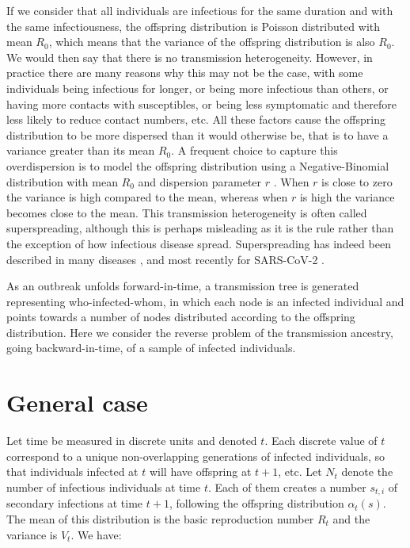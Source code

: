 \documentclass{article}
\begin{document}
If we consider that all
individuals are infectious for the same duration and with the same infectiousness,
the offspring distribution is Poisson distributed with mean $R_0$, which means that the variance
of the offspring distribution is also $R_0$. We would then say that there is no transmission
heterogeneity. However, in practice there are many reasons why this may not be the case,
with some individuals being infectious for longer, or being more infectious than others, or 
having more contacts with susceptibles, or being less symptomatic and therefore less likely
to reduce contact numbers, etc. All these factors cause the offspring distribution to be more 
dispersed than it would otherwise be, that is to have a variance greater than its mean $R_0$. 
A frequent choice to capture this overdispersion is to model the offspring distribution
using a Negative-Binomial distribution with mean $R_0$ and dispersion parameter $r$
\citep{Lloyd-Smith2005,Grassly2008}. When $r$ is close to zero the variance is high compared to the mean,
whereas when $r$ is high the variance becomes close to the mean. This transmission heterogeneity
is often called superspreading, although this is perhaps misleading
as it is the rule rather than the exception of how infectious disease spread. Superspreading has
indeed been described in many diseases \citep{woolhouseHeterogeneitiesTransmissionInfectious1997,
steinSuperspreadersInfectiousDiseases2011,wangSuperspreadingHeterogeneityTransmission2021}, 
and most recently for 
SARS-CoV-2 \citep{Wang2020,lemieuxPhylogeneticAnalysisSARSCoV22021,gomez-carballaSuperspreadingEmergenceCOVID192021}.

As an outbreak unfolds forward-in-time, a transmission tree is generated representing who-infected-whom,
in which each node is an infected individual and points towards a number of nodes distributed according
to the offspring distribution. Here we consider the reverse problem of the transmission ancestry, going backward-in-time,
of a sample of infected individuals. 

\section{General case}

Let time be measured in discrete units and denoted $t$. Each discrete value of $t$ correspond to a unique non-overlapping 
generations of infected individuals, so that individuals infected at $t$ will have offspring at $t+1$, etc. 
Let $N_t$ denote the number of infectious individuals at time $t$. Each of them creates a number $s_{t,i}$ of secondary infections at time $t+1$, following the offspring distribution $\alpha_t(s)$. The mean of this distribution is the basic reproduction number $R_t$ and the variance is $V_t$. We have:
\end{document}

